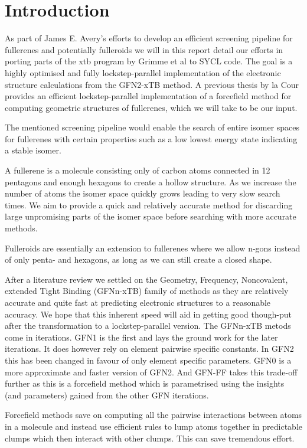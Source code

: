 \chapter{Introduction}
As part of James E. Avery's efforts to develop an efficient screening pipeline for fullerenes and potentially fulleroids we will in this report detail our efforts in porting parts of the xtb program by Grimme et al to SYCL code. The goal is a highly optimised and fully lockstep-parallel implementation of the electronic structure calculations from the GFN2-xTB method. A previous thesis by la Cour provides an efficient lockstep-parallel implementation of a forcefield method for computing geometric structures of fullerenes, which we will take to be our input. 

The mentioned screening pipeline would enable the search of entire isomer spaces for fullerenes with certain properties such as a low lowest energy state indicating a stable isomer. 

A fullerene is a molecule consisting only of carbon atoms connected in 12 pentagons and enough hexagons to create a hollow structure. As we increase the number of atoms the isomer space quickly grows leading to very slow search times. We aim to provide a quick and relatively accurate method for discarding large unpromising parts of the isomer space before searching with more accurate methods.

Fulleroids are essentially an extension to fullerenes where we allow n-gons instead of only penta- and hexagons, as long as we can still create a closed shape. 

After a literature review we settled on the Geometry, Frequency, Noncovalent, extended Tight Binding (GFNn-xTB) family of methods as they are relatively accurate and quite fast at predicting electronic structures to a reasonable accuracy. We hope that this inherent speed will aid in getting good though-put after the transformation to a lockstep-parallel version. The GFNn-xTB metods come in iterations. GFN1 is the first and lays the ground work for the later iterations. It does however rely on element pairwise specific constants. In GFN2 this has been changed in favour of only element specific parameters. GFN0 is a more approximate and faster version of GFN2. And GFN-FF takes this trade-off further as this is a forcefield method which is parametrised using the insights (and parameters) gained from the other GFN iterations. 

Forcefield methods save on computing all the pairwise interactions between atoms in a molecule and instead use efficient rules to lump atoms together in predictable clumps which then interact with other clumps. This can save tremendous effort. 

